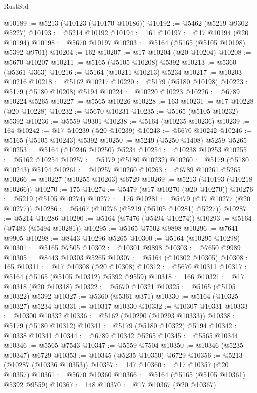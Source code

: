 \begin{lexlean}{RustStd}
\begin{coremodule}
@10189 := @5213 (@10123 (@10170 @10186))
@10192 := @5462 (@5219 @9302 @5227)
@10193 := @5214 @10192
@10194 := 161
@10197 := @17 @10194 (@20 @10194)
@10198 := @5670 @10197
@10203 := @5164 (@5165 (@5105 @10198) @5392 @9701)
@10204 := 162
@10207 := @17 @10204 (@20 @10204)
@10208 := @5670 @10207
@10211 := @5165 (@5105 @10208) @5392
@10213 := @5360 (@5361 @363)
@10216 := @5164 (@10211 @10213) @5234
@10217 := @10203 @10216
@10218 := @5162 @10217
@10220 := @5179 (@5180 @10198)
@10223 := @5179 (@5180 @10208) @5194
@10224 := @10220 @10223
@10226 := @6789 @10224 @5265
@10227 := @5565 @10226
@10228 := 163
@10231 := @17 @10228 (@20 @10228)
@10232 := @5670 @10231
@10235 := @5165 (@5105 @10232) @5392
@10236 := @5559 @9301
@10238 := @5164 (@10235 @10236)
@10239 := 164
@10242 := @17 @10239 (@20 @10239)
@10243 := @5670 @10242
@10246 := @5165 (@5105 @10243) @5392
@10250 := @5249 (@5250 @1408) @5259 @5265
@10253 := @5164 (@10246 @10250) @5234
@10254 := @10238 @10253
@10255 := @5162 @10254
@10257 := @5179 (@5180 @10232)
@10260 := @5179 (@5180 @10243) @5194
@10261 := @10257 @10260
@10263 := @6789 @10261 @5265
@10266 := @10227 (@10255 @10263) @6729
@10269 := @5213 (@10193 (@10218 @10266))
@10270 := 175
@10274 := @5479 (@17 @10270 (@20 @10270))
@10276 := @5219 (@5105 @10274)
@10277 := 176
@10281 := @5479 (@17 @10277 (@20 @10277))
@10286 := @5467 (@10276 (@5219 (@5105 @10281) @5227))
@10287 := @5214 @10286
@10290 := @5164 (@7476 (@5494 @10274))
@10293 := @5164 (@7483 (@5494 @10281))
@10295 := @5165 @7502 @9898
@10296 := @7641 @9905
@10298 := @8443 @10296 @5265
@10300 := @5164 (@10295 @10298)
@10301 := @5165 @7505
@10302 := @10301 @9898
@10303 := @7650 @9989
@10305 := @8443 @10303 @5265
@10307 := @5164 (@10302 @10305)
@10308 := 165
@10311 := @17 @10308 (@20 @10308)
@10312 := @5670 @10311
@10317 := @5164 (@5165 (@5105 @10312) @5392 @9559)
@10318 := 166
@10321 := @17 @10318 (@20 @10318)
@10322 := @5670 @10321
@10325 := @5165 (@5105 @10322) @5392
@10327 := @5360 (@5361 @371)
@10330 := @5164 (@10325 @10327) @5234
@10331 := @10317 @10330
@10332 := @10307 @10331
@10333 := @10300 @10332
@10336 := @5162 (@10290 (@10293 @10333))
@10338 := @5179 (@5180 @10312)
@10341 := @5179 (@5180 @10322) @5194
@10342 := @10338 @10341
@10344 := @6789 @10342 @5265
@10345 := @5565 @10344
@10346 := @5565 @7543
@10347 := @5559 @7504
@10350 := @10346 (@5235 @10347) @6729
@10353 := @10345 (@5235 @10350) @6729
@10356 := @5213 (@10287 (@10336 @10353))
@10357 := 147
@10360 := @17 @10357 (@20 @10357)
@10361 := @5670 @10360
@10366 := @5164 (@5165 (@5105 @10361) @5392 @9559)
@10367 := 148
@10370 := @17 @10367 (@20 @10367)

\end{coremodule}
\end{lexlean}
